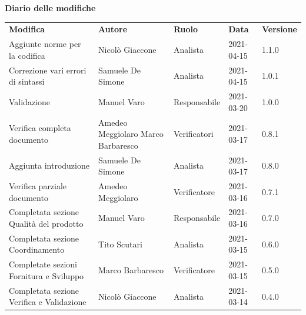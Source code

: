 \documentclass[a4paper]{article}
\begin{document}
\begin{center}

    \textbf{\Large Diario delle modifiche}\\
    \vspace{10px}
    \begin{table}[h!]
        \centering
        \renewcommand{\arraystretch}{1.8}
        \begin{tabular}{p{160px} p{90px} p{65px} p{60px} p{45px}}
            \rowcolor{logo!70} \textbf{Modifica}        & \textbf{Autore}                             & \textbf{Ruolo} & \textbf{Data} & \textbf{Versione} \\
            Aggiunte norme per la codifica              & Nicolò Giaccone                             & Analista       & 2021-04-15    & 1.1.0             \\
            Correzione vari errori di sintassi          & Samuele De Simone                           & Analista       & 2021-04-15    & 1.0.1             \\
            Validazione                                 & Manuel Varo                                 & Responsabile   & 2021-03-20    & 1.0.0             \\
            Verifica completa documento                 & Amedeo Meggiolaro \newline Marco Barbaresco & Verificatori   & 2021-03-17    & 0.8.1             \\
            Aggiunta introduzione                       & Samuele De Simone                           & Analista       & 2021-03-17    & 0.8.0             \\
            Verifica parziale documento                 & Amedeo Meggiolaro                           & Verificatore   & 2021-03-16    & 0.7.1             \\
            Completata sezione Qualità del prodotto     & Manuel Varo                                 & Responsabile   & 2021-03-16    & 0.7.0             \\
            Completata sezione Coordinamento            & Tito Scutari                                & Analista       & 2021-03-15    & 0.6.0             \\
            Completate sezioni Fornitura e Sviluppo     & Marco Barbaresco                            & Verificatore   & 2021-03-15    & 0.5.0             \\
            Completata sezione Verifica e Validazione   & Nicolò Giaccone                             & Analista       & 2021-03-14    & 0.4.0             \\

\end{tabular}
\end{table}
\end{center}
\end{document}
